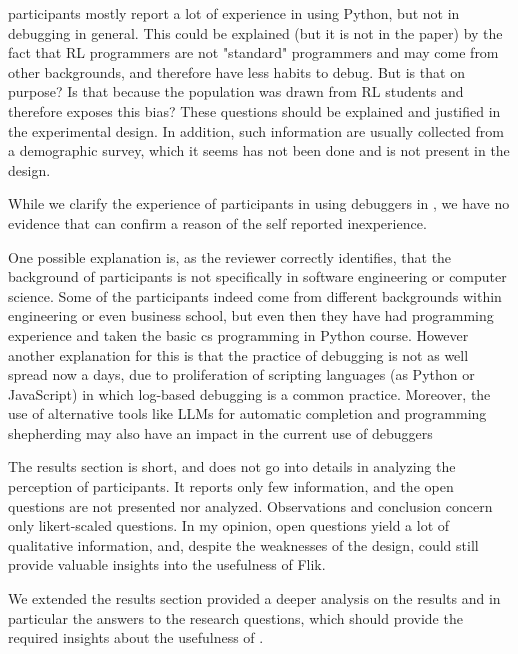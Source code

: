 \begin{remark} \label{rem:characterization2}
participants mostly report a lot of experience in using Python, but not in debugging in general. This could be explained (but it is not in the paper) by the fact that RL programmers are not "standard" programmers and may come from other backgrounds, and therefore have less habits to debug. But is that on purpose? Is that because the population was drawn from RL students and therefore exposes this bias? These questions should be explained and justified in the experimental design. In addition, such information are usually collected from a demographic survey, which it seems has not been done and is not present in the design.
\end{remark}
\begin{clarify}
While we clarify the experience of participants in using debuggers in , we have no evidence that can confirm a reason of the self reported inexperience. 

One possible explanation is, as the reviewer correctly identifies, that the background of participants is not specifically in software engineering or computer science. Some of the participants indeed come from different backgrounds within engineering or even business school, but even then they have had programming experience and taken the basic cs programming in Python course. However another explanation for this is that the practice of debugging is not as well spread now a days, due to proliferation of scripting languages (as Python or JavaScript) in which log-based debugging is a common practice. Moreover, the use of alternative tools like LLMs for automatic completion and programming shepherding may also have an impact in the current use of debuggers
\end{clarify}

\begin{remark} \label{rem:results}
The results section is short, and does not go into details in analyzing the perception of participants. It reports only few information, and the open questions are not presented nor analyzed. Observations and conclusion concern only likert-scaled questions. In my opinion, open questions yield a lot of qualitative information, and, despite the weaknesses of the design, could still provide valuable insights into the usefulness of Flik.
\end{remark}
\begin{solved}
We extended the results section provided a deeper analysis on the results and in particular the answers to the research questions, which should provide the required insights about  the usefulness of \flik.
\end{solved}

